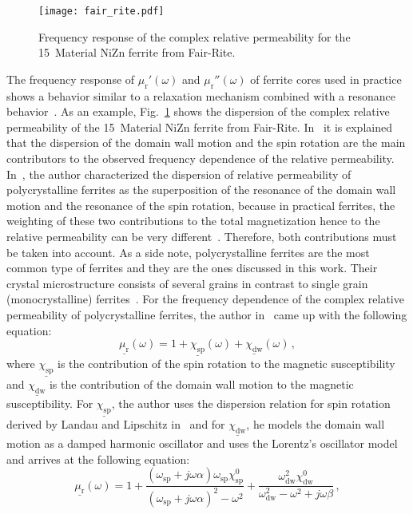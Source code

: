\begin{figure}[ptb]
	\centering
	\texttt{[image: fair\_rite.pdf]}
	\caption{Frequency response of the complex relative permeability for the 15~Material NiZn ferrite from Fair-Rite.}
	\label{fig:dispersion}
\end{figure} 
The frequency response of $\mu_\mathrm{r}'(\omega)$ and $\mu_\mathrm{r}''(\omega)$ of ferrite cores used in practice shows a behavior similar to a relaxation mechanism combined with a resonance behavior~\cite{wijn}. As an example, Fig.~\ref{fig:dispersion} shows the dispersion of the complex relative permeability of the 15~Material NiZn ferrite from Fair-Rite. In~\cite{wijn} it is explained that the dispersion of the domain wall motion and the spin rotation are the main contributors to the observed frequency dependence of the relative permeability. In~\cite{tsutaoka}, the author characterized the dispersion of relative permeability of polycrystalline ferrites as the superposition of the resonance of the domain wall motion and the resonance of the spin rotation, because in practical ferrites, the weighting of these two contributions to the total magnetization hence to the relative permeability can be very different~\cite{nakamura}. Therefore, both contributions must be taken into account. As a side note, polycrystalline ferrites are the most common type of ferrites and they are the ones discussed in this work. Their crystal microstructure consists of several grains in contrast to single grain (monocrystalline) ferrites~\cite{wijn}. For the frequency dependence of the complex relative permeability of polycrystalline ferrites, the author in~\cite{tsutaoka} came up with the following equation:
\begin{equation} \label{eqn:disp1}
	\underline{\mu_\mathrm{r}}(\omega) = 1 + \underline{\chi_\mathrm{sp}}(\omega)  +  \underline{\chi_\mathrm{dw}}(\omega)\,,
\end{equation}
where $\underline{\chi_\mathrm{sp}}$ is the contribution of the spin rotation to the magnetic susceptibility and $\underline{\chi_\mathrm{dw}}$ is the contribution of the domain wall motion to the magnetic susceptibility. For $\underline{\chi_\mathrm{sp}}$, the author uses the dispersion relation for spin rotation derived by Landau and Lipschitz in~\cite{landau} and for $\underline{\chi_\mathrm{dw}}$, he models the domain wall motion as a damped harmonic oscillator and uses the Lorentz's oscillator model~\cite{werkstoffe} and arrives at the following equation:
\begin{equation} \label{eqn:disp2}
	\underline{\mu_\mathrm{r}}(\omega) = 1 + \frac{(\omega_\mathrm{sp}+j\omega\alpha)\omega_\mathrm{sp}\chi_\mathrm{sp}^0}{(\omega_\mathrm{sp}+j\omega\alpha)^2-\omega^2} +  \frac{\omega_\mathrm{dw}^2\chi_\mathrm{dw}^0}{\omega_\mathrm{dw}^2-\omega^2+j\omega\beta}\,,
\end{equation}

